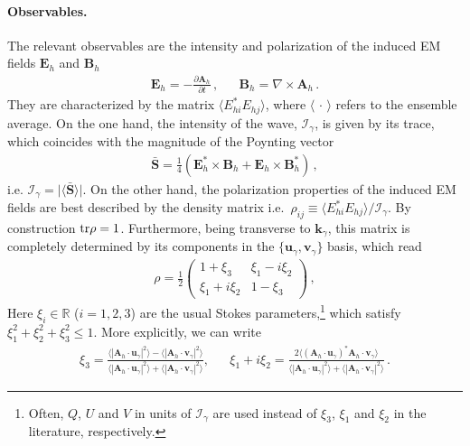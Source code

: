 \documentclass[a4paper,11pt]{article}
\begin{document}
\paragraph{Observables.}

The relevant observables are the intensity and polarization of the induced EM fields ${\bm E}_{h}$ and  ${\bm B}_{h}$
%
\begin{align}
    \bm{E}_{h} = - \frac{\partial \bm{A}_{h}}{\partial t} \,, && \bm{B}_{h} = \nabla \times \bm{A}_{h} \, .
\end{align}
%
They are characterized by the matrix $\langle E_{h i}^{*} E_{h j} \rangle $, 
where $ \langle \, \cdot \, \rangle $ refers to the ensemble average.
%
On the one hand, the intensity of the wave, $\mathcal{I}_{\gamma}$, is
given by its trace,  which coincides with the magnitude of the Poynting vector
%
\begin{align}
    \bar{\bm S}  = \frac{1}{4} \left( {\bm E}_{h}^{*} \times {\bm B}_{h} + {\bm E}_{h} \times {\bm B}_{h}^{*} \right) \,,
    \label{eq:Poynting}
\end{align}
i.e. $ \mathcal{I}_{\gamma}  = \vert \langle \bar{\bm S} \rangle \vert $.
%
On the other hand, the polarization properties of the induced EM fields are
best described by the density matrix
i.e.\ $ \rho_{ij} \equiv \langle E_{h i}^{*} E_{h j} \rangle / \mathcal{I}_{\gamma} $. By construction ${\rm tr} \rho =1$. Furthermore, being transverse to ${\bm k}_\gamma$, this matrix is completely determined by its components in the $\{{\bm u}_\gamma, {\bm v}_\gamma\}$ basis, which read
%
\begin{align}
    \rho = \frac{1}{2} \begin{pmatrix}
        1 + \xi_{3}  & \xi_{1} - i \xi_{2} \\
        \xi_{1} + i \xi_{2} & 1 - \xi_{3}
    \end{pmatrix}  \,,
    \label{eq:pol_matrix}
\end{align}
%
Here $ \xi_{i}  \in \mathbb{R}$ ($ i = 1,2,3$) are the usual Stokes parameters,\footnote{Often, $Q$, $U$ and $V$ in units of $\mathcal{I}_{\gamma}$ are used instead of $ \xi_{3}$, $ \xi_{1} $ and $ \xi_{2} $ in the literature, respectively. }
which satisfy $\xi_1^2+\xi_2^2+\xi_3^2 \leq 1$. 
%
More explicitly, we can write
%
\begin{align}
    \xi_3 = \frac{ \langle|{\bm A}_{h} \cdot {\bm u}_{\gamma}|^2\rangle - \langle|{\bm A}_{h} \cdot {\bm v}_{\gamma}|^2\rangle }{\langle|{\bm A}_{h} \cdot {\bm u}_{\gamma}|^2\rangle + \langle|{\bm A}_{h} \cdot {\bm v}_{\gamma}|^2\rangle} ,
    &&
    \xi_1 + i \xi_2 = \frac{ 2 \langle ({\bm A}_{h} \cdot {\bm u}_{\gamma})^* {\bm A}_{h} \cdot {\bm v}_{\gamma} \rangle }{\langle|{\bm A}_{h} \cdot {\bm u}_{\gamma}|^2\rangle + \langle|{\bm A}_{h} \cdot {\bm v}_{\gamma}|^2\rangle} \, .
    \label{eq:pol_components}
\end{align}
\end{document}
